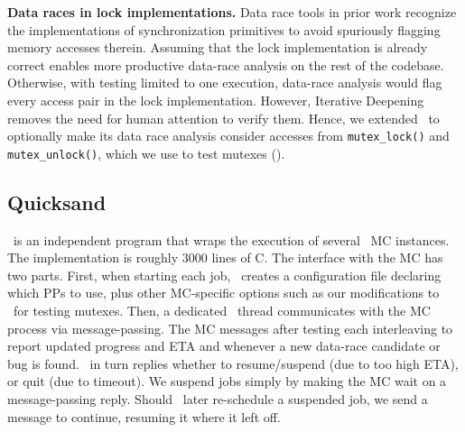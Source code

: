 {\bf Data races in lock implementations.}
Data race tools in prior work \cite{tsan,portend} recognize the implementations of synchronization primitives to avoid spuriously flagging memory accesses therein. %
Assuming that the lock implementation is already correct enables more productive data-race analysis on the rest of the codebase.
Otherwise, with testing limited to one execution,
data-race analysis would flag every access pair in the lock implementation. %
However, Iterative Deepening removes the need for human attention to verify them. %
Hence, we extended \landslide~to
optionally make its data race analysis consider accesses from {\tt mutex\_lock()} and {\tt mutex\_unlock()},
which we use to test mutexes (\sect{\ref{sec:testsuite}}).

\subsection{Quicksand}

\quicksand~is an independent program that wraps the execution of several \landslide~MC instances.
The implementation is roughly 3000 lines of C.
The interface with the MC has two parts. %
First, when starting each job, \quicksand~creates a configuration file declaring which PPs to use,
plus other MC-specific options such as our modifications to \landslide~for testing mutexes. %
Then, a dedicated \quicksand~thread communicates with the MC process via message-passing. %
The MC messages after testing each interleaving to report updated progress and ETA
and whenever a new data-race candidate or bug is found.
\quicksand~in turn replies whether to resume/suspend (due to too high ETA), or quit (due to timeout).
We suspend jobs simply by making the MC wait on a message-passing reply.
Should \quicksand~later re-schedule a suspended job, we send a message to continue,
resuming it where it left off.
